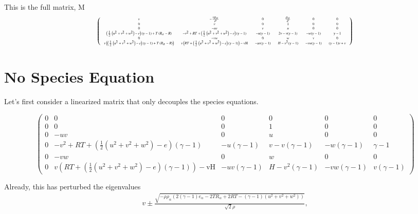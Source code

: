 \documentclass[letterpaper,11pt,nointlimits,reqno]{amsart}
\begin{document}
This is the full matrix, M
\begin{equation}
\tiny \left(
\begin{array}{cccccc}
 v & -\frac{v \rho _{\alpha }}{\rho } & 0 & \frac{\rho _{\alpha }}{\rho } & 0 & 0 \\
 0 & v & 0 & 1 & 0 & 0 \\
 0 & -u v & v & u & 0 & 0 \\
 \left(\frac{1}{2} \left(u^2+v^2+w^2\right)-e\right) (\gamma -1)+T \left(R_{\alpha }-R\right) & -v^2+R T+\left(\frac{1}{2}
   \left(u^2+v^2+w^2\right)-e\right) (\gamma -1) & -u (\gamma -1) & 2 v-v (\gamma -1) & -w (\gamma -1) & \gamma -1 \\
 0 & -v w & 0 & w & v & 0 \\
 v \left(\left(\frac{1}{2} \left(u^2+v^2+w^2\right)-e\right) (\gamma -1)+T \left(R_{\alpha }-R\right)\right) & v \left(R T+\left(\frac{1}{2}
   \left(u^2+v^2+w^2\right)-e\right) (\gamma -1)\right)-\text{vH} & -u v (\gamma -1) & H-v^2 (\gamma -1) & -v w (\gamma -1) & (\gamma -1) v+v
\end{array}
\right)
\end{equation}

\section{No Species Equation}

Let's first consider a linearized matrix that only decouples the species equations.

\begin{equation}
\left(
\begin{array}{cccccc}
 0 & 0 & 0 & 0 & 0 & 0 \\
 0 & 0 & 0 & 1 & 0 & 0 \\
 0 & -u v & 0 & u & 0 & 0 \\
 0 & -v^2+R T+\left(\frac{1}{2} \left(u^2+v^2+w^2\right)-e\right) (\gamma -1) & -u (\gamma -1) & v-v (\gamma -1) & -w (\gamma -1) & \gamma -1 \\
 0 & -v w & 0 & w & 0 & 0 \\
 0 & v \left(R T+\left(\frac{1}{2} \left(u^2+v^2+w^2\right)-e\right) (\gamma -1)\right)-\text{vH} & -u v (\gamma -1) & H-v^2 (\gamma -1) & -v w
   (\gamma -1) & v (\gamma -1)
\end{array}
\right)
\end{equation}

Already, this has perturbed the eigenvalues
\begin{align}
v \pm \frac{\sqrt{-\rho  \rho _{\alpha } \left(2 (\gamma -1) e_\alpha-2 T
 R_{\alpha}+2 R T-(\gamma -1) \left(u^2+v^2+w^2\right)\right)}}{\sqrt{2}
 \rho },\\
\end{align}
\end{document}

